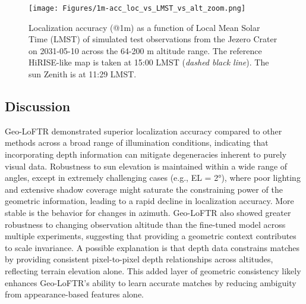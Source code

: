 \begin{figure}
\centering
\texttt{[image: Figures/1m-acc\_loc\_vs\_LMST\_vs\_alt\_zoom.png]} 
\caption{Localization accuracy (@1m) as a function of Local Mean Solar Time (LMST) of simulated test observations from the Jezero Crater on 2031-05-10 across the 64-200 m altitude range. The reference HiRISE-like map is taken at 15:00 LMST (\textit{dashed black line}). The sun Zenith is at 11:29 LMST.}
\vspace{-10pt}
\label{fig:loc_acc_vs_lmst_1acc_vs_alt}
\end{figure}

\subsection{Discussion}
\label{subsec:discussion}
Geo-LoFTR demonstrated superior localization accuracy compared to other methods across a broad range of illumination conditions, indicating that incorporating depth information can mitigate degeneracies inherent to purely visual data. Robustness to sun elevation is maintained within a wide range of angles, except in extremely challenging cases (e.g., EL = 2°), where poor lighting and extensive shadow coverage might saturate the constraining power of the geometric information, leading to a rapid decline in localization accuracy. More stable is the behavior for changes in azimuth.
Geo-LoFTR also showed greater robustness to changing observation altitude than the fine-tuned model across multiple experiments, suggesting that providing a geometric context contributes to scale invariance. A possible explanation is that depth data constrains matches by providing consistent pixel-to-pixel depth relationships across altitudes, reflecting terrain elevation alone. This added layer of geometric consistency likely enhances Geo-LoFTR's ability to learn accurate matches by reducing ambiguity from appearance-based features alone.

